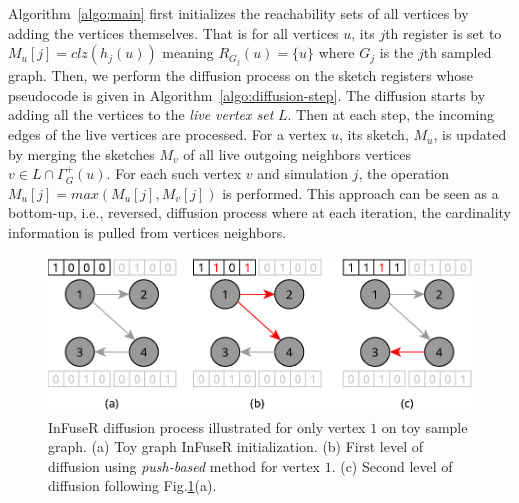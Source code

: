  Algorithm~\ref{algo:main} first initializes the reachability sets of all vertices by adding the vertices themselves. 
 That is for all vertices $u$, its $j$th register is set to $M_u[j]=clz(h_j(u))$ meaning $R_{{G}_j}(u) = \{u\}$ where $G_j$ is the $j$th sampled graph. 
 Then, we perform the diffusion process on the sketch registers whose pseudocode is given in Algorithm~\ref{algo:diffusion-step}. The diffusion starts by adding all the vertices to the {\em live vertex set} $L$. 
 Then at each step, the incoming edges of the live vertices are processed. 
 For a vertex $u$, its sketch, $M_u$, is updated by merging the sketches $M_v$ of all live outgoing neighbors vertices $v \in {L} \cap \Gamma^+_{G}(u)$. For each such vertex $v$ and simulation $j$, the operation $M_u[j] = max(M_u[j], M_v[j])$ is performed. This approach can be seen as a bottom-up, i.e., reversed,  diffusion process where at each iteration, the cardinality information is pulled from vertices neighbors.
 \begin{figure}[!ht]
    \begin{center}
    \includegraphics[width=\linewidth]{images/infuserdiff.pdf}
    \caption{InFuseR diffusion process illustrated for only vertex $1$ on toy sample graph.  (a) \label{fig:infuserinit} Toy graph InFuseR initialization.  (b) \label{infuserdiff1} First level of diffusion using \emph{push-based} method for vertex $1$. (c) Second level of diffusion following Fig.\ref{fig:infuserdiff}(a).
     }\label{fig:infuserdiff} 
    \end{center}
\end{figure}
